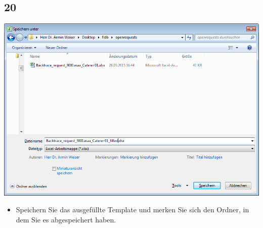 \documentclass{beamer}
\begin{document}
\subsection{20}
\begin{frame}
	\begin{center}
  		\includegraphics[height=0.6\textheight]{20.png}
	\end{center}
	\begin{itemize}
		\item Speichern Sie das ausgefüllte Template und merken Sie sich den Ordner, in dem Sie es abgespeichert haben.
	\end{itemize}
\end{frame}
\end{document}
